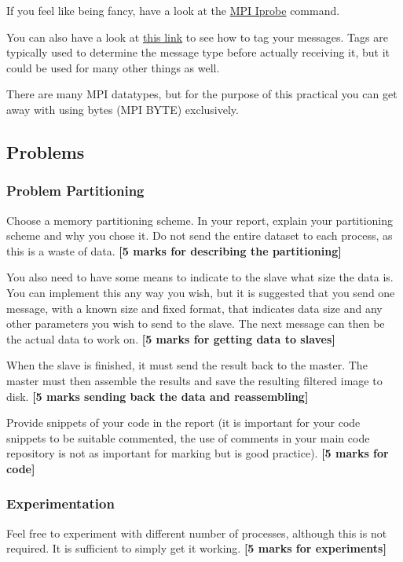 If you feel like being fancy, have a look at the \href{https://mpi.deino.net/mpi_functions/MPI_Iprobe.html}{MPI Iprobe} command. 

You can also have a look at \href{http://stackoverflow.com/questions/12637550/using-mpibyte-to-receive-any-data-type}{this link} to see how to tag your messages. Tags are typically used to determine the message type before actually receiving it, but it could be used for many other things as well. 

There are many MPI datatypes, but for the purpose of this practical you can get away with using bytes (MPI BYTE) exclusively.

\subsection{Problems}
\subsubsection{Problem Partitioning}
Choose a memory partitioning scheme. In your report, explain your partitioning scheme and why you chose it. Do not send the entire dataset to each process, as this is a waste of data. \textbf{[5 marks for describing the partitioning]}

You also need to have some means to indicate to the slave what size the data is. You can implement this any way you wish, but it is suggested that you send one message, with a known size and fixed format, that indicates data size and any other parameters you wish to send to the slave. The next message can then be the actual data to work on. \textbf{[5 marks for getting data to slaves]}

When the slave is finished, it must send the result back to the master. The master must then assemble the results and save the resulting filtered image to disk. \textbf{[5 marks sending back the data and reassembling]}

Provide snippets of your code in the report (it is important for your code snippets to be suitable commented, the use of comments in your main code repository is not as important for marking but is good practice). \textbf{[5 marks for code]}

\subsubsection{Experimentation}
Feel free to experiment with different number of processes, although this is not required. It is sufficient to simply get it working. \textbf{[5 marks for experiments]}

